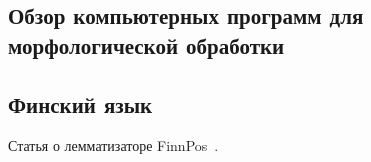 






\subsection{Обзор компьютерных программ для морфологической обработки}

\subsection{Финский язык}\label{sect_review_fin}

Статья о лемматизаторе FinnPos~\cite{silfverberg2016finnpos}.

